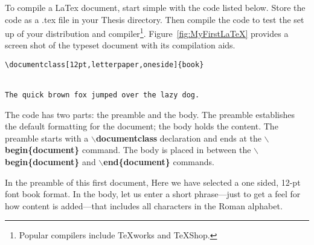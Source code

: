 To compile a LaTex document, start simple with the code listed 
below.  Store the code as a .tex file in your
Thesis directory. Then compile the code to test the set up of your \Latex 
distribution and compiler\footnote{Popular compilers include TeXworks 
and TeXShop.}.  Figure~\ref{fig:MyFirstLaTeX} provides a screen
shot of the typeset document with its compilation aids.

 {\singlespace   
 \begin{verbatim}
\documentclass[12pt,letterpaper,oneside]{book}
 

The quick brown fox jumped over the lazy dog.

\end{verbatim}
} 
\noindent The code has two parts: the preamble and the body.  The
preamble establishes the default formatting for the document; the body
holds the content.  The preamble starts with a {\bf $\backslash$documentclass}
declaration and ends at the {\bf $\backslash$begin\{document\}}
command. The {body} is placed in between the {\bf
$\backslash$begin\{document\}} and {\bf $\backslash$end\{document\}}
commands. 

In the preamble of this first document, Here we have selected a one
sided, 12-pt font book format.  In the body, let us enter a short
phrase---just to get a feel for how content is added---that includes 
all characters in the Roman alphabet.
    
   


